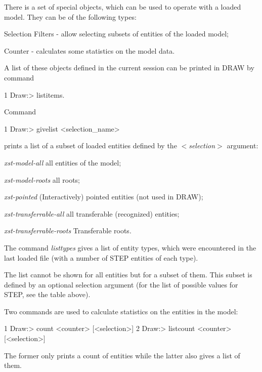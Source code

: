 There is a set of special objects, which can be used to operate with a loaded model. They can be of the following types\+:
\begin{DoxyItemize}
\item Selection Filters -\/ allow selecting subsets of entities of the loaded model;
\item Counter -\/ calculates some statistics on the model data.
\end{DoxyItemize}

A list of these objects defined in the current session can be printed in D\+R\+AW by command
\begin{DoxyCode}
1 Draw:> listitems. 
\end{DoxyCode}


Command
\begin{DoxyCode}
1 Draw:> givelist <selection\_name> 
\end{DoxyCode}
 prints a list of a subset of loaded entities defined by the {\itshape $<$selection$>$} argument\+:


\begin{DoxyItemize}
\item {\itshape xst-\/model-\/all} all entities of the model;
\item {\itshape xst-\/model-\/roots} all roots;
\item {\itshape xst-\/pointed} (Interactively) pointed entities (not used in D\+R\+AW);
\item {\itshape xst-\/transferrable-\/all} all transferable (recognized) entities;
\item {\itshape xst-\/transferrable-\/roots} Transferable roots.
\end{DoxyItemize}

The command {\itshape listtypes} gives a list of entity types, which were encountered in the last loaded file (with a number of S\+T\+EP entities of each type).

The list cannot be shown for all entities but for a subset of them. This subset is defined by an optional selection argument (for the list of possible values for S\+T\+EP, see the table above).

Two commands are used to calculate statistics on the entities in the model\+: 
\begin{DoxyCode}
1 Draw:> count <counter> [<selection>] 
2 Draw:> listcount <counter> [<selection>] 
\end{DoxyCode}
 The former only prints a count of entities while the latter also gives a list of them.

